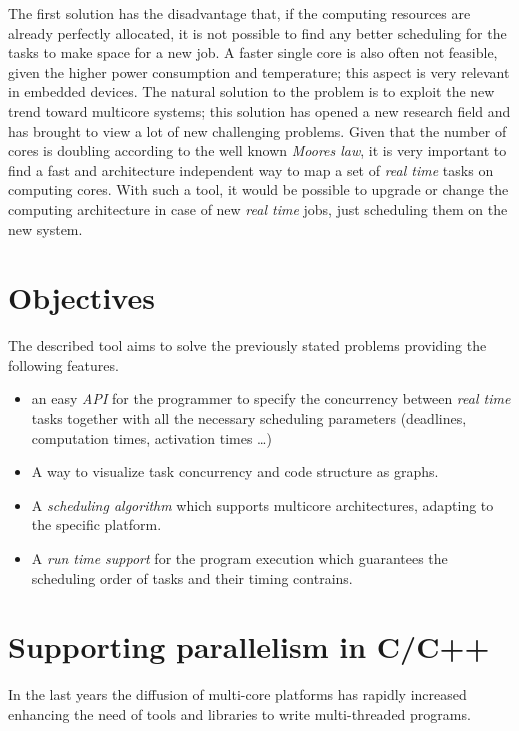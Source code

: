 \documentclass[a4paper,11pt,oneside]{book}
\begin{document}
The first solution has the disadvantage that, if the computing resources are already perfectly allocated, it is not possible to find any better scheduling for the tasks to make space for a new job. A faster single core is also often not feasible, given the higher power consumption and temperature; this aspect is very relevant in embedded devices. 
The natural solution to the problem is to exploit the new trend toward multicore systems; this solution has opened a new research field and has brought to view a lot of new challenging problems. Given that the number of cores is doubling according to the well known \emph{Moores law}, it is very important to find a fast and architecture independent way to map a set of \emph{real time} tasks on computing cores. With such a tool, it would be possible to upgrade or change the computing architecture in case of new \emph{real time} jobs, just scheduling them on the new system.


\section{Objectives}

The described tool aims to solve the previously stated problems providing the following features.

\begin{itemize}
\item{an easy \emph{API} for the programmer to specify the concurrency between \emph{real time} tasks together with all the necessary scheduling parameters (deadlines, computation times, activation times \dots)}
\item{A way to visualize task concurrency and code structure as graphs.}
\item{A \emph{scheduling algorithm} which supports multicore architectures, adapting to the specific platform.}
\item{A \emph{run time support} for the program execution which guarantees the scheduling order of tasks and their timing contrains.}
\end{itemize}


\section{Supporting parallelism in C/C++}

In the last years the diffusion of multi-core platforms has rapidly increased enhancing the need of tools and libraries to write multi-threaded programs. 
\end{document}
